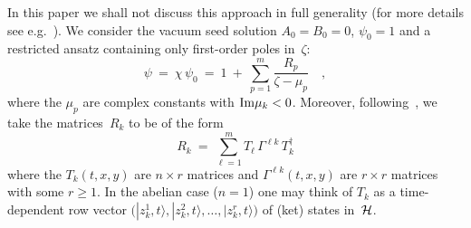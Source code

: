 \documentclass[a4paper,11pt]{article}
\numberwithin{equation}{section}
\newcommand{\Hcal}{{\cal H}}
\newcommand{\Tdag}{T^{\dagger}}
\begin{document}
In this paper we shall not discuss this approach in full generality
(for more details see e.g.~\cite{zakharov,zakh2,forgacs}).
We consider the vacuum seed solution
$A_0=B_0=0$, $\psi_0=1$ and a restricted ansatz containing only first-order
poles in~$\zeta$:
\begin{equation} \label{ansatzpsi}
\psi\ =\ \chi\,\psi_0\ =\ 1\ +\ \sum_{p=1}^m \frac{R_p}{\zeta-\mu_p} \quad,
\end{equation}
where the $\mu_p$ are complex constants with ${\rm Im}\mu_k<0$.
Moreover, following~\cite{forgacs}, we take the matrices~$R_k$ to be of the form
\begin{equation} \label{ansatzR}
R_k\ =\ \sum_{\ell=1}^m T_\ell\,\Gamma^{\ell k}\,\Tdag_k
\end{equation}
where the $T_k(t,x,y)$ are $n{\times}r$ matrices and $\Gamma^{\ell k}(t,x,y)$
are $r{\times}r$ matrices with some $r{\ge}1$.
In the abelian case ($n{=}1$) one may think of $T_k$ as a time-dependent
row vector
$\bigl(|z_k^1,t\rangle,|z_k^2,t\rangle,\ldots,|z_k^r,t\rangle\bigr)$
of (ket) states in~$\Hcal$.
\end{document}
